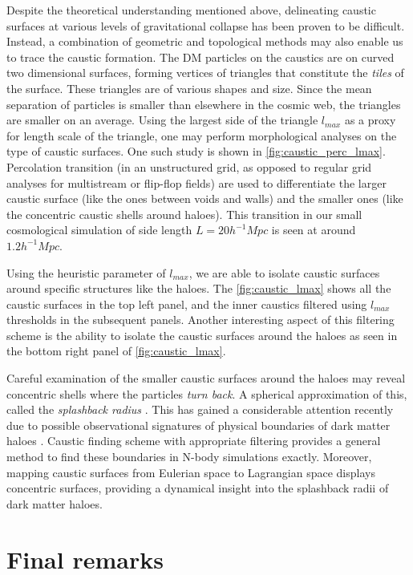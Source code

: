 Despite the theoretical understanding mentioned above, delineating caustic surfaces at various levels of gravitational collapse has been proven to be difficult. Instead, a combination of geometric and topological methods may also enable us to trace the caustic formation. The DM particles on the caustics are on curved two dimensional surfaces, forming vertices of triangles that constitute the {\it tiles} of the surface. These triangles are of various shapes and size. Since the mean separation of particles is smaller than elsewhere in the cosmic web, the triangles are smaller on an average. Using the largest side of the triangle $l_{max}$ as a proxy for length scale of the triangle, one may perform morphological analyses on the type of caustic surfaces. One such study is shown in \autoref{fig:caustic_perc_lmax}. Percolation transition (in an unstructured grid, as opposed to regular grid analyses for multistream or flip-flop fields) are used to differentiate the larger caustic surface (like the ones between voids and walls) and the smaller ones (like the concentric caustic shells around haloes). This transition in our small cosmological simulation of side length $L = 20 h^{-1} Mpc$ is seen at around $1.2 h^{-1} Mpc$. 


Using the heuristic parameter of $l_{max}$, we are able to isolate caustic surfaces around specific structures like the haloes. The \autoref{fig:caustic_lmax} shows all the caustic surfaces in the top left panel, and the inner caustics filtered using $l_{max}$ thresholds in the subsequent panels. Another interesting aspect of this filtering scheme is the ability to isolate the caustic surfaces around the haloes as seen in the bottom right panel of \autoref{fig:caustic_lmax}. 


Careful examination of the smaller caustic surfaces around the haloes may reveal concentric shells where the particles {\it turn back}. A spherical approximation of this, called the {\it splashback radius} \citep{More2015}. This has gained a considerable attention recently due to possible observational signatures of physical boundaries of dark matter haloes \citep{Chang2017}. Caustic finding scheme with appropriate filtering provides a general method to find these boundaries in N-body simulations exactly. Moreover, mapping caustic surfaces from Eulerian space to Lagrangian space displays concentric surfaces, providing a dynamical insight into the splashback radii of dark matter haloes. 



\section{Final remarks}

